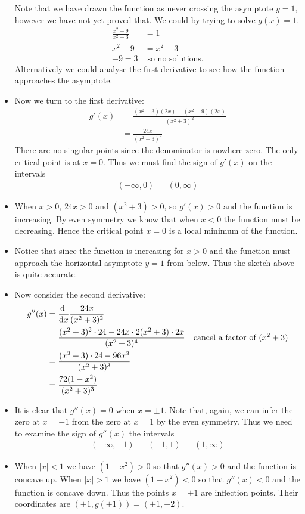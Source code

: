 \begin{eg}
\begin{itemize}
\begin{efig}
\begin{center}
 \end{center}
\end{efig}
Note that we have drawn the function as never crossing the asymptote $y=1$, however we
have not yet proved that.  We could by trying to solve $g(x)=1$.
\begin{align*}
  \frac{x^2-9}{x^2+3} &= 1 \\
  x^2-9 &= x^2+3 \\
  -9=3 & \text{ so no solutions.}
\end{align*}
Alternatively we could analyse the first derivative to see how the function approaches
the asymptote.

\item Now we turn to the first derivative:
\begin{align*}
  g'(x) &= \frac{(x^2+3)(2x) - (x^2-9)(2x)}{(x^2+3)^2}\\
  &= \frac{24x}{(x^2+3)^2}
\end{align*}
There are no singular points since the denominator is nowhere zero. The only critical
point is at $x=0$. Thus we must find the sign of $g'(x)$ on the intervals
\begin{align*}
  (-\infty,0) && (0,\infty)
\end{align*}
\item When $x>0$, $24x>0$ and $(x^2+3)>0$, so $g'(x)>0$ and the function is increasing.
By even symmetry we know that when $x<0$ the function must be decreasing. Hence the
critical point $x=0$ is a local minimum of the function.
\item Notice that since the function is increasing for $x>0$ and the function must
approach the horizontal asymptote $y=1$ from below. Thus the sketch above is quite
accurate.

\item Now consider the second derivative:
\begin{align*}
  g''(x) &= \diff{}{x} \frac{24x}{(x^2+3)^2}\\
  &= \frac{(x^2+3)^2 \cdot 24 - 24x\cdot 2 (x^2+3)\cdot2x}{(x^2+3)^4} & \text{cancel a
factor of $(x^2+3)$}\\
  &= \frac{(x^2+3) \cdot 24 - 96x^2}{(x^2+3)^3} \\
  &= \frac{72(1-x^2)}{(x^2+3)^3}
\end{align*}
\item It is clear that $g''(x) = 0$ when $x=\pm 1$. Note that, again, we can infer
the zero at $x=-1$ from the zero at $x=1$ by the even symmetry.  Thus we need to examine
the sign of $g''(x)$ the intervals
\begin{align*}
  (-\infty,-1)&&(-1,1)&&(1,\infty)
\end{align*}
\item When $|x|<1$ we have $(1-x^2)>0$ so that $g''(x)>0$ and the function is
concave up. When $|x|>1$ we have $(1-x^2)<0$ so that $g''(x)<0$ and the function is
concave down. Thus the points $x=\pm 1$ are inflection points. Their coordinates are
$(\pm1, g(\pm1)) =(\pm 1,-2)$.


\end{itemize}
\end{eg}
